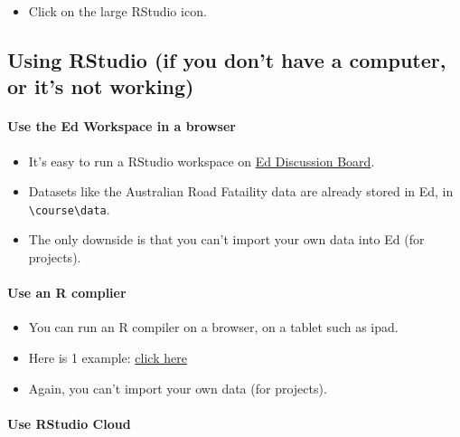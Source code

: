 \documentclass[]{article}
\providecommand{\tightlist}{%
  \setlength{\itemsep}{0pt}\setlength{\parskip}{0pt}}
\let\oldparagraph\paragraph
\renewcommand{\paragraph}[1]{\oldparagraph{#1}\mbox{}}
\begin{document}
\begin{itemize}
\tightlist
\item
  Click on the large RStudio icon.
\end{itemize}

\hypertarget{using-rstudio-if-you-dont-have-a-computer-or-its-not-working}{%
\subsection{Using RStudio (if you don't have a computer, or it's not working)}\label{using-rstudio-if-you-dont-have-a-computer-or-its-not-working}}

\hypertarget{use-the-ed-workspace-in-a-browser}{%
\paragraph{Use the Ed Workspace in a browser}\label{use-the-ed-workspace-in-a-browser}}

\begin{itemize}
\tightlist
\item
  It's easy to run a RStudio workspace on \href{https://edstem.org/dashboard}{Ed Discussion Board}.
\item
  Datasets like the Australian Road Fataility data are already stored in Ed, in \texttt{\textbackslash{}course\textbackslash{}data}.
\item
  The only downside is that you can't import your own data into Ed (for projects).
\end{itemize}

\hypertarget{use-an-r-complier}{%
\paragraph{Use an R complier}\label{use-an-r-complier}}

\begin{itemize}
\tightlist
\item
  You can run an R compiler on a browser, on a tablet such as ipad.
\item
  Here is 1 example: \href{https://rextester.com/l/r_online_compiler}{click here}
\item
  Again, you can't import your own data (for projects).
\end{itemize}

\hypertarget{use-rstudio-cloud}{%
\paragraph{Use RStudio Cloud}\label{use-rstudio-cloud}}
\end{document}
